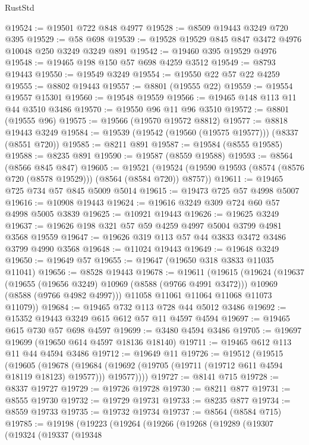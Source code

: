 \begin{lexlean}{RustStd}
\begin{coremodule}
@19524 := @19501 @722 @848 @4977
@19528 := @8509 @19443 @3249 @720 @395
@19529 := @58 @698
@19539 := @19528 @19529 @845 @847 @3472 @4976 @10048 @250 @3249 @3249 @891
@19542 := @19460 @395 @19529 @4976
@19548 := @19465 @198 @150 @57 @698 @4259 @3512
@19549 := @8793 @19443
@19550 := @19549 @3249
@19554 := @19550 @22 @57 @22 @4259
@19555 := @8802 @19443
@19557 := @8801 (@19555 @22)
@19559 := @19554 @19557 @15301
@19560 := @19548 @19559
@19566 := @19465 @148 @113 @11 @44 @3510 @3486
@19570 := @19550 @96 @11 @96 @3510
@19572 := @8801 (@19555 @96)
@19575 := @19566 (@19570 @19572 @8812)
@19577 := @8818 @19443 @3249
@19584 := @19539 (@19542 (@19560 (@19575 @19577))) (@8337 (@8551 @720))
@19585 := @8211 @891
@19587 := @19584 (@8555 @19585)
@19588 := @8235 @891
@19590 := @19587 (@8559 @19588)
@19593 := @8564 (@8566 @845 @847)
@19605 := @19521
    (@19524 (@19590 @19593 (@8574 (@8576 @720 (@8578 @19529))) (@8564 (@8584 @720)) @8757))
@19611 := @19465 @725 @734 @57 @845 @5009 @5014
@19615 := @19473 @725 @57 @4998 @5007
@19616 := @10908 @19443
@19624 := @19616 @3249 @309 @724 @60 @57 @4998 @5005 @3839
@19625 := @10921 @19443
@19626 := @19625 @3249
@19637 := @19626 @198 @321 @57 @59 @4259 @4997 @5004 @3799 @4981 @3568 @19559
@19647 := @19626 @319 @113 @57 @44 @3833 @3472 @3486 @3799 @4990 @3568
@19648 := @11024 @19443
@19649 := @19648 @3249
@19650 := @19649 @57
@19655 := @19647 (@19650 @318 @3833 @11035 @11041)
@19656 := @8528 @19443
@19678 := @19611
    (@19615
      (@19624
        (@19637
          (@19655 (@19656 @3249) @10969 (@8588 (@9766 @4991 @3472)))
          @10969
          (@8588 (@9766 @4982 @4997)))
        @11058
        @11061
        @11064
        @11068
        @11073
        @11079))
@19684 := @19465 @732 @113 @728 @44 @5012 @3486
@19692 := @15352 @19443 @3249 @615 @612 @57 @11 @4597 @4594
@19697 := @19465 @615 @730 @57 @698 @4597
@19699 := @3480 @4594 @3486
@19705 := @19697 @19699 (@19650 @614 @4597 @18136 @18140)
@19711 := @19465 @612 @113 @11 @44 @4594 @3486
@19712 := @19649 @11
@19726 := @19512
    (@19515
      (@19605
        (@19678
          (@19684 (@19692 (@19705 (@19711 (@19712 @611 @4594 @18119 @18123) @19577))) @19577))))
@19727 := @8141 @715
@19728 := @8337 @19727
@19729 := @19726 @19728
@19730 := @8211 @877
@19731 := @8555 @19730
@19732 := @19729 @19731
@19733 := @8235 @877
@19734 := @8559 @19733
@19735 := @19732 @19734
@19737 := @8564 (@8584 @715)
@19785 := @19198
    (@19223
      (@19264
        (@19266
          (@19268
            (@19289
              (@19307
                (@19324
                  (@19337
                    (@19348

\end{coremodule}
\end{lexlean}
